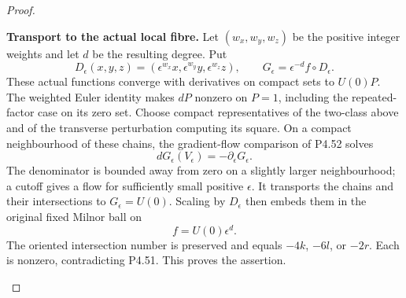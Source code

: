 \begin{proof}
\begin{enumerate}[label={$\langle1\rangle$\arabic*.},leftmargin=*]
\par\medskip\noindent\textbf{Transport to the actual local fibre.}
Let $(w_x,w_y,w_z)$ be the positive integer weights
and let $d$ be the resulting degree. Put
\[
 D_\epsilon(x,y,z)=
       (\epsilon^{w_x}x,\epsilon^{w_y}y,\epsilon^{w_z}z),
 \qquad
 G_\epsilon=\epsilon^{-d}f\circ D_\epsilon.
\]
These actual functions converge with derivatives on
compact sets to $U(0)P$. The weighted Euler identity
makes $dP$ nonzero on $P=1$, including the repeated-factor
case on its zero set. Choose compact representatives
of the two-class above and of the transverse
perturbation computing its square. On a compact
neighbourhood of these chains, the gradient-flow
comparison of P4.52 solves
\[
       dG_\epsilon(V_\epsilon)
                         =-\partial_\epsilon G_\epsilon.
\]
The denominator is bounded away from zero on a
slightly larger neighbourhood; a cutoff gives a
flow for sufficiently small positive $\epsilon$.
It transports the chains and their intersections
to $G_\epsilon=U(0)$. Scaling by $D_\epsilon$ then
embeds them in the original fixed Milnor ball on
\[
                         f=U(0)\epsilon^d.
\]
The oriented intersection number is preserved and
equals $-4k$, $-6l$, or $-2r$. Each is nonzero,
contradicting P4.51. This proves the assertion.

\end{enumerate}
\end{proof}
